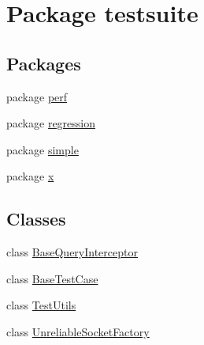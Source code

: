 \hypertarget{namespacetestsuite}{}\section{Package testsuite}
\label{namespacetestsuite}
\subsection*{Packages}
\begin{DoxyCompactItemize}
\item 
package \mbox{\hyperlink{namespacetestsuite_1_1perf}{perf}}
\item 
package \mbox{\hyperlink{namespacetestsuite_1_1regression}{regression}}
\item 
package \mbox{\hyperlink{namespacetestsuite_1_1simple}{simple}}
\item 
package \mbox{\hyperlink{namespacetestsuite_1_1x}{x}}
\end{DoxyCompactItemize}
\subsection*{Classes}
\begin{DoxyCompactItemize}
\item 
class \mbox{\hyperlink{classtestsuite_1_1_base_query_interceptor}{Base\+Query\+Interceptor}}
\item 
class \mbox{\hyperlink{classtestsuite_1_1_base_test_case}{Base\+Test\+Case}}
\item 
class \mbox{\hyperlink{classtestsuite_1_1_test_utils}{Test\+Utils}}
\item 
class \mbox{\hyperlink{classtestsuite_1_1_unreliable_socket_factory}{Unreliable\+Socket\+Factory}}
\end{DoxyCompactItemize}
